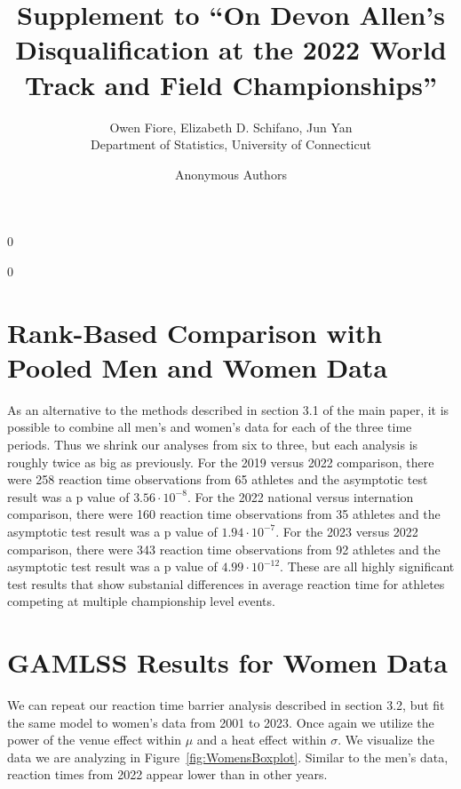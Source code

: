 \documentclass[12pt, letterpaper]{article}
\newcommand{\blind}{0}
\begin{document}
\title{\bf Supplement to ``On Devon Allen's Disqualification at the 2022 World Track and Field Championships''}

\blind
{
  \author{Owen Fiore, %
  Elizabeth D. Schifano, %
  Jun Yan\\[1ex]
  Department of Statistics, University of Connecticut\\
}
} \fi

\blind
{
  \bigskip
  \bigskip
  \bigskip
  \author{Anonymous Authors}
  \bigskip
} \fi

\maketitle 

\section{Rank-Based Comparison with Pooled Men and Women Data}
As an alternative to the methods described in section 3.1 of the main paper, it
is possible to combine all men's and women's data for each of the three time
periods.  Thus we shrink our analyses from six to three, but each analysis
is roughly twice as big as previously.  For the 2019 versus 2022 comparison,
there were 258 reaction time observations from 65 athletes and the asymptotic
test result was a p value of $3.56 \cdot 10^{-8}$. For the 2022 national versus
internation comparison, there were 160 reaction time observations from 35
athletes and the asymptotic test result was a p value of $1.94 \cdot 10^{-7}$.
For the 2023 versus 2022 comparison, there were 343 reaction time observations
from 92 athletes and the asymptotic test result was a p value of
$4.99 \cdot 10^{-12}$.  These are all highly significant test results that show
substanial differences in average reaction time for athletes competing at
multiple championship level events.


\section{GAMLSS Results for Women Data}
We can repeat our reaction time barrier analysis described in section 3.2, but
fit the same model to women's data from 2001 to 2023.  Once again we utilize
the power of the venue effect within $\mu$ and a heat effect within $\sigma$. 
We visualize the data we are analyzing in Figure~\ref{fig:WomensBoxplot}.
Similar to the men's data, reaction times from 2022 appear lower than in other
years. 
\end{document}
